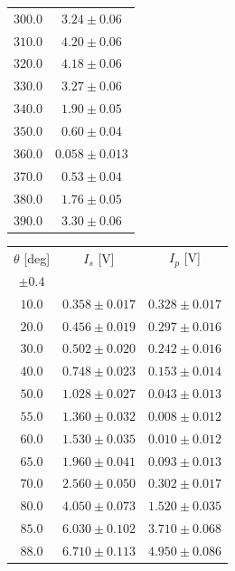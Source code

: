 \documentclass[10pt,oneside,a4paper]{article}
\begin{document}
\begin{table}[H]
\begin{tabular}{cc}
  $300.0$ &$ 3.24 \pm 0.06$ \\
  $310.0$ &$ 4.20 \pm 0.06$ \\
  $320.0$ &$ 4.18 \pm 0.06$ \\
  $330.0$ &$ 3.27 \pm 0.06$ \\
  $340.0$ &$ 1.90 \pm 0.05$ \\
  $350.0$ &$ 0.60 \pm 0.04$ \\
  $360.0$ &$ 0.058 \pm 0.013$ \\
  $370.0$ &$ 0.53 \pm 0.04$ \\
  $380.0$ &$ 1.76 \pm 0.05$ \\
  $390.0$ &$ 3.30 \pm 0.06$ \\
\hline
\end{tabular}
\end{table}





\begin{table}[H]
\centering
{}
\label{tab:brewster}
\begin{tabular}{ccc}
\hline
 $\theta$ [deg]& $I_s$ [V]&$I_p$ [V]\\
 $\pm 0.4$ & &\\
\hline
   $10.0   $&  $ 0.358 \pm 0.017   $&$ 0.328 \pm 0.017 $\\
   $20.0   $&  $ 0.456 \pm 0.019   $&$ 0.297 \pm 0.016 $\\
   $30.0   $&  $ 0.502 \pm 0.020   $&$ 0.242 \pm 0.016 $\\
   $40.0   $&  $ 0.748 \pm 0.023   $&$ 0.153 \pm 0.014 $\\
   $50.0   $&  $ 1.028 \pm 0.027   $&$ 0.043 \pm 0.013 $\\
   $55.0   $&  $ 1.360 \pm 0.032   $&$ 0.008 \pm 0.012 $\\
   $60.0   $&  $ 1.530 \pm 0.035   $&$ 0.010 \pm 0.012 $\\
   $65.0   $&  $ 1.960 \pm 0.041   $&$ 0.093 \pm 0.013 $\\
   $70.0   $&  $ 2.560 \pm 0.050   $&$ 0.302 \pm 0.017 $\\
   $80.0   $&  $ 4.050 \pm 0.073   $&$ 1.520 \pm 0.035 $\\
   $85.0   $&  $ 6.030 \pm 0.102   $&$ 3.710 \pm 0.068 $\\
   $88.0   $&  $ 6.710 \pm 0.113   $&$ 4.950 \pm 0.086 $\\
\hline
\end{tabular}
\end{table}
\end{document}
